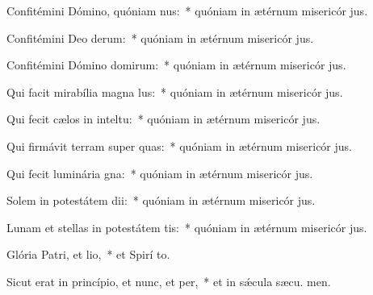 \item Confitémini Dómino, quóniam nus:~* quóniam in ætérnum misericór jus.
\item Confitémini Deo derum:~* quóniam in ætérnum misericór jus.
\item Confitémini Dómino domirum:~* quóniam in ætérnum misericór jus.
\item Qui facit mirabília magna lus:~* quóniam in ætérnum misericór jus.
\item Qui fecit cælos in inteltu:~* quóniam in ætérnum misericór jus.
\item Qui firmávit terram super quas:~* quóniam in ætérnum misericór jus.
\item Qui fecit luminária gna:~* quóniam in ætérnum misericór jus.
\item Solem in potestátem dii:~* quóniam in ætérnum misericór jus.
\item Lunam et stellas in potestátem tis:~* quóniam in ætérnum misericór jus.
\item Glória Patri, et lio,~* et Spirí to.
\item Sicut erat in princípio, et nunc, et per,~* et in sǽcula sæcu. men.
